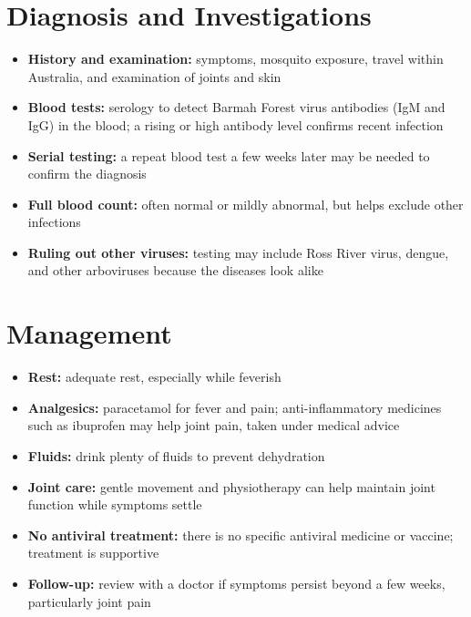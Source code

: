 \section*{Diagnosis and Investigations}
\begin{itemize}
    \item \textbf{History and examination:} symptoms, mosquito exposure, travel within Australia, and examination of joints and skin
    \item \textbf{Blood tests:} serology to detect Barmah Forest virus antibodies (IgM and IgG) in the blood; a rising or high antibody level confirms recent infection
    \item \textbf{Serial testing:} a repeat blood test a few weeks later may be needed to confirm the diagnosis
    \item \textbf{Full blood count:} often normal or mildly abnormal, but helps exclude other infections
    \item \textbf{Ruling out other viruses:} testing may include Ross River virus, dengue, and other arboviruses because the diseases look alike
\end{itemize}

\section*{Management}
\begin{itemize}
    \item \textbf{Rest:} adequate rest, especially while feverish
    \item \textbf{Analgesics:} paracetamol for fever and pain; anti-inflammatory medicines such as ibuprofen may help joint pain, taken under medical advice
    \item \textbf{Fluids:} drink plenty of fluids to prevent dehydration
    \item \textbf{Joint care:} gentle movement and physiotherapy can help maintain joint function while symptoms settle
    \item \textbf{No antiviral treatment:} there is no specific antiviral medicine or vaccine; treatment is supportive
    \item \textbf{Follow-up:} review with a doctor if symptoms persist beyond a few weeks, particularly joint pain
\end{itemize}

